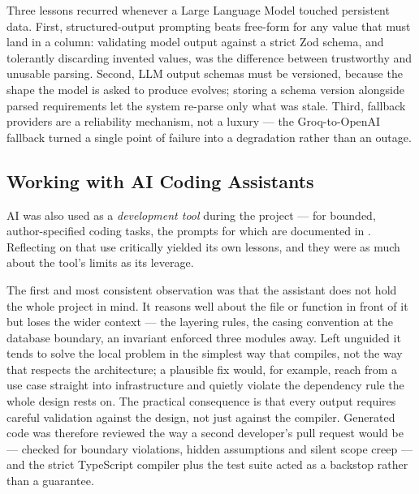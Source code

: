 Three lessons recurred whenever a Large Language Model touched persistent
data. First, structured-output prompting beats free-form for any
value that must land in a column: validating model output against a strict
Zod schema, and tolerantly discarding invented values, was the difference
between trustworthy and unusable parsing. Second, LLM output schemas
must be versioned, because the shape the model is asked to produce evolves;
storing a schema version alongside parsed requirements let the system
re-parse only what was stale. Third, fallback providers are a
reliability mechanism, not a luxury --- the Groq-to-OpenAI fallback turned a
single point of failure into a degradation rather than an outage.

\subsection{Working with AI Coding Assistants}
\label{sec:concl-ai-dev}

AI was also used as a \emph{development tool} during the project --- for
bounded, author-specified coding tasks, the prompts for which are documented
in . Reflecting on that use critically yielded its own
lessons, and they were as much about the tool's limits as its leverage.

The first and most consistent observation was that the assistant does
not hold the whole project in mind. It reasons well about the file or
function in front of it but loses the wider context --- the layering rules,
the casing convention at the database boundary, an invariant enforced three
modules away. Left unguided it tends to solve the local problem in the
simplest way that compiles, not the way that respects the architecture; a
plausible fix would, for example, reach from a use case straight into
infrastructure and quietly violate the dependency rule the whole design
rests on. The practical consequence is that every output requires
careful validation against the design, not just against the compiler.
Generated code was therefore reviewed the way a second developer's pull
request would be --- checked for boundary violations, hidden assumptions and
silent scope creep --- and the strict TypeScript compiler plus the test suite
acted as a backstop rather than a guarantee.

